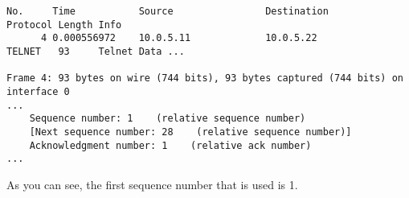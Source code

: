 \begin{verbatim}
No.     Time           Source                Destination           Protocol Length Info
      4 0.000556972    10.0.5.11             10.0.5.22             TELNET   93     Telnet Data ...

Frame 4: 93 bytes on wire (744 bits), 93 bytes captured (744 bits) on interface 0
...
    Sequence number: 1    (relative sequence number)
    [Next sequence number: 28    (relative sequence number)]
    Acknowledgment number: 1    (relative ack number)
...
\end{verbatim}

As you can see, the first sequence number that is used is 1.